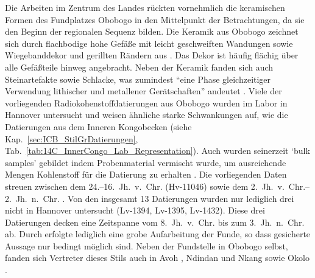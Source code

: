 Die Arbeiten im Zentrum des Landes rückten vornehmlich die keramischen Formen des Fundplatzes Obobogo in den Mittelpunkt der Betrachtungen, da sie den Beginn der regionalen Sequenz bilden. Die Keramik aus Obobogo zeichnet sich durch flachbodige hohe Gefäße mit leicht geschweiften Wandungen sowie Wiegebanddekor und gerillten Rändern aus \parencite{Claes.1985}. Das Dekor ist häufig flächig über alle Gefäßteile hinweg angebracht. Neben der Keramik fanden sich auch Steinartefakte sowie Schlacke, was zumindest \enquote{eine Phase gleichzeitiger Verwendung lithischer und metallener Gerätschaften} andeutet \parencite[258f.]{Wotzka.1995}. Viele der vorliegenden Radiokohenstoffdatierungen aus Obobogo wurden im Labor in Hannover untersucht und weisen ähnliche starke Schwankungen auf, wie die Datierungen aus dem Inneren Kongobecken (siehe Kap.~\ref{sec:ICB_StilGrDatierungen}, Tab.~\ref{tab:14C_InnerCongo_Lab_Representation}). Auch wurden seinerzeit \enquote*{bulk samples} gebildet indem Probenmaterial vermischt wurde, um ausreichende Mengen Kohlenstoff für die Datierung zu erhalten \parencite[723]{Clist.20042005}. Die vorliegenden Daten streuen zwischen dem 24.--16.~Jh.~v.~Chr. (Hv-11046) sowie dem 2.~Jh.~v.~Chr.--2.~Jh.~n.~Chr. \parencites[Hv-10832;][147]{deMaret.1985b}[219f.]{Clist.1986}[nach][249 Anm. 21]{Wotzka.1995}. Von den insgesamt 13 Datierungen wurden nur lediglich drei nicht in Hannover untersucht (Lv-1394, Lv-1395, Lv-1432). Diese drei Datierungen decken eine Zeitspanne vom 8.~Jh.~v.~Chr. bis zum 3.~Jh.~n.~Chr. ab. Durch \textcite{Claes.1985} erfolgte lediglich eine grobe Aufarbeitung der Funde, so dass gesicherte Aussage nur bedingt möglich sind. Neben der Fundstelle in Obobogo selbst, fanden sich Vertreter dieses Stils auch in Avoh \parencite{Elouga.20002001}, Ndindan und Nkang \parencite{MbidaMindzie.19951996} sowie Okolo \parencites{Atangana.1988}[siehe][249 Abb.~133]{NlendNlend.20132014}. 

